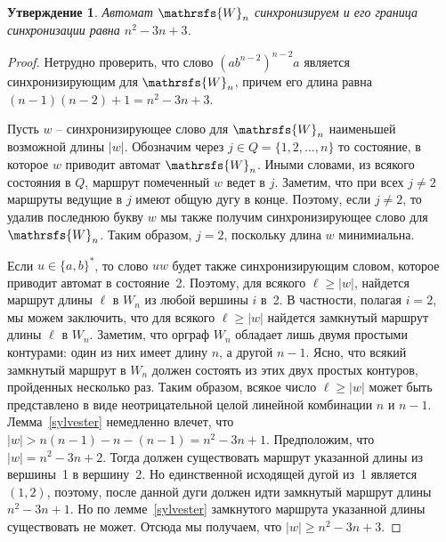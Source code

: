\documentclass[11pt]{article}
\newcommand{\sw}{reset word}
\newtheorem{theorem}{Утверждение}
\begin{document}
\begin{theorem}
\label{theorem:anan}
Автомат $\mathrsfs{W}_n$ синхронизируем и его граница синхронизации равна $n^2-3n+3$.
\end{theorem}

\begin{proof}

Нетрудно проверить, что слово $(ab^{n-2})^{n-2}a$ является синхронизирующим
для $\mathrsfs{W}_n$, причем его длина равна $(n-1)(n-2)+1=n^2-3n+3$.



Пусть $w$ -- синхронизирующее слово для $\mathrsfs{W}_n$ наименьшей
возможной длины $|w|$. Обозначим через $j\in Q=\{1,2,\dots,n\}$ то
состояние, в которое $w$ приводит автомат $\mathrsfs{W}_n$. 
Иными словами, из всякого состояния в $Q$, маршрут помеченный $w$ ведет
в $j$. Заметим, что при всех $j\ne 2$ маршруты ведущие в $j$ имеют общую дугу в конце.
Поэтому, если $j\ne 2$, то удалив последнюю букву $w$ мы также получим
синхронизирующее слово для $\mathrsfs{W}_n$.
Таким образом, $j=2$, поскольку длина $w$ минимиальна.



Если $u\in\{a,b\}^*$, то слово $uw$ будет также синхронизирующим словом,
которое приводит автомат в состояние~2. Поэтому, для всякого $\ell\ge|w|$,
найдется маршрут длины $\ell$ в $W_n$ из любой вершины $i$ в~2. В частности,
полагая $i=2$, мы можем заключить, что для всякого $\ell\ge|w|$ найдется 
замкнутый маршрут длины $\ell$ в $W_n$. Заметим, что орграф $W_n$ обладает лишь 
двумя простыми контурами: один из них имеет длину $n$, а другой $n-1$. Ясно, что всякий 
замкнутый маршрут в $W_n$ должен состоять
из этих двух простых контуров, пройденных несколько раз.
Таким образом, всякое число $\ell\ge|w|$ может быть представлено в виде неотрицательной
целой линейной комбинации $n$ и $n-1$. Лемма~\ref{sylvester} немедленно влечет, что
$|w|>n(n-1)-n-(n-1)=n^2-3n+1$. Предположим, что $|w|=n^2-3n+2$.
Тогда должен существовать маршрут указанной длины из вершины~1 в вершину~2.
Но единственной исходящей дугой из~1 является $(1,2)$, поэтому, после данной дуги
должен идти замкнутый маршрут длины $n^2-3n+1$. Но по лемме~\ref{sylvester} 
замкнутого маршрута указанной длины существовать не может. 
Отсюда мы получаем, что $|w|\ge n^2-3n+3$.



\end{proof}
\end{document}
